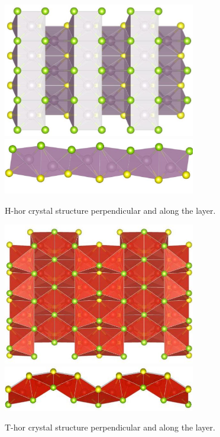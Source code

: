 \documentclass[a4paperm]{article}
\begin{document}
\begin{figure}[H]
	\includegraphics[width=0.75\textwidth]{H_hor_1.jpg} \\
	\includegraphics[width=0.75\textwidth]{H_hor_2.jpg}
	\caption{H-hor crystal structure perpendicular and along the layer.}
\label{H_hor}
\end{figure} 


\begin{figure}[H]
        \includegraphics[width=0.75\textwidth]{T_hor_1.jpg} \\
        \includegraphics[width=0.75\textwidth]{T_hor_2.jpg}
        \caption{T-hor crystal structure perpendicular and along the layer.}
\label{T_hor}
\end{figure}
\end{document}
